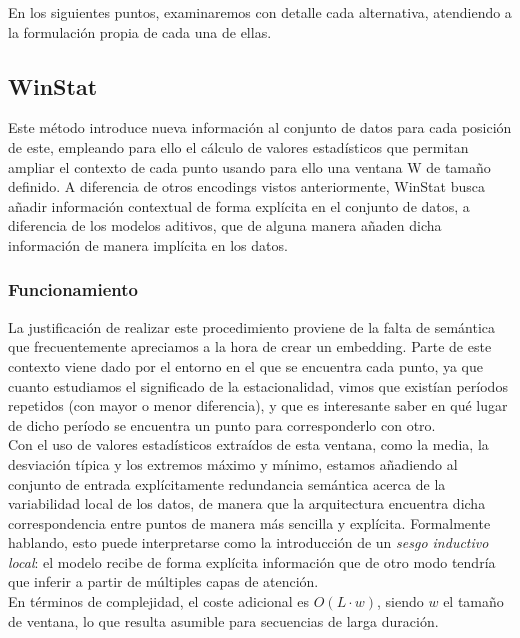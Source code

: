 En los siguientes puntos, examinaremos con detalle cada alternativa, atendiendo a la formulación propia de cada una de ellas.

\subsection{WinStat}

Este método introduce nueva información al conjunto de datos para cada posición de este, empleando para ello el cálculo de valores estadísticos que permitan ampliar el contexto de cada punto usando para ello una ventana W de tamaño definido. A diferencia de otros encodings vistos anteriormente, WinStat busca añadir información contextual de forma explícita en el conjunto de datos, a diferencia de los modelos aditivos, que de alguna manera añaden dicha información de manera implícita en los datos.

\subsubsection{Funcionamiento}

La justificación de realizar este procedimiento proviene de la falta de semántica que frecuentemente apreciamos a la hora de crear un embedding. Parte de este contexto viene dado por el entorno en el que se encuentra cada punto, ya que cuanto estudiamos el significado de la estacionalidad, vimos que existían períodos repetidos (con mayor o menor diferencia), y que es interesante saber en qué lugar de dicho período se encuentra un punto para corresponderlo con otro.\\

Con el uso de valores estadísticos extraídos de esta ventana, como la media, la desviación típica y los extremos máximo y mínimo, estamos añadiendo al conjunto de entrada explícitamente redundancia semántica acerca de la variabilidad local de los datos, de manera que la arquitectura encuentra dicha correspondencia entre puntos de manera más sencilla y explícita. Formalmente hablando, esto puede interpretarse como la introducción de un \textit{sesgo inductivo local}: el modelo recibe de forma explícita información que de otro modo tendría que inferir a partir de múltiples capas de atención.\\

En términos de complejidad, el coste adicional es $O(L \cdot w)$, siendo $w$ el tamaño de ventana, lo que resulta asumible para secuencias de larga duración.\\

